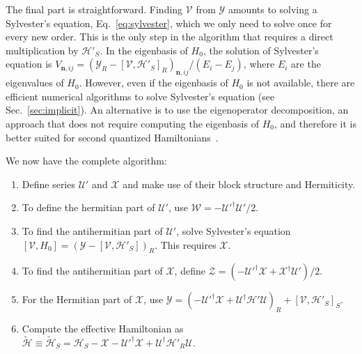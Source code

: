 The final part is straightforward.
Finding $\mathcal{V}$ from $\mathcal{Y}$ amounts to solving a Sylvester's equation, Eq.~\ref{eq:sylvester}, which we only need to solve once for every new order.
This is the only step in the algorithm that requires a direct multiplication by $\mathcal{H}'_{S}$.
In the eigenbasis of $H_0$, the solution of Sylvester's equation is $V_{\mathbf{n}, ij} = (\mathcal{Y}_{R} - [\mathcal{V},
\mathcal{H}'_{S}]_{R})_{\mathbf{n}, ij}/(E_i - E_j)$, where $E_i$ are the eigenvalues of $H_0$.
However, even if the eigenbasis of $H_0$ is not available, there are efficient numerical algorithms to solve Sylvester's equation (see Sec.~\ref{sec:implicit}).
An alternative is to use the eigenoperator decomposition, an approach that does not require computing the eigenbasis of $H_0$, and therefore it is better suited for second quantized Hamiltonians~\cite{Landi_2024,Reascos_2024}.

We now have the complete algorithm:
%
\begin{enumerate}
    \item Define series $\mathcal{U}'$ and $\mathcal{X}$ and make use of their block structure and Hermiticity.
    \item To define the hermitian part of $\mathcal{U}'$, use $\mathcal{W} = -\mathcal{U}'^\dagger\mathcal{U}'/2$.
    \item To find the antihermitian part of $\mathcal{U}'$, solve Sylvester's equation \\ $[\mathcal{V}, H_0] = (\mathcal{Y} - [\mathcal{V}, \mathcal{H}'_{S}])_{R}$.
      This requires $\mathcal{X}$.
    \item To find the antihermitian part of $\mathcal{X}$, define $\mathcal{Z} = (-\mathcal{U}'^\dagger\mathcal{X} + \mathcal{X}^\dagger\mathcal{U}')/2$.
    \item For the Hermitian part of $\mathcal{X}$, use $\mathcal{Y} = (-\mathcal{U}'^\dagger\mathcal{X} + \mathcal{U}^\dagger\mathcal{H}'\mathcal{U})_{R} + [\mathcal{V}, \mathcal{H}'_{S}]_{S}$.
    \item  Compute the effective Hamiltonian as $\tilde{\mathcal{H}} \equiv \tilde{\mathcal{H}}_{S} = \mathcal{H}_{S} - \mathcal{X} - \mathcal{U}'^\dagger \mathcal{X} + \mathcal{U}^\dagger\mathcal{H}'_{R}\mathcal{U}$.
\end{enumerate}

